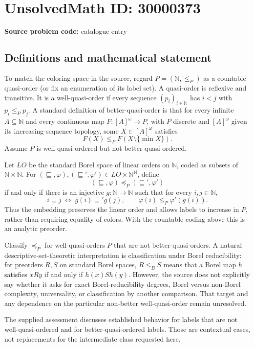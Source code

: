 \documentclass[11pt]{article}
\newcommand{\N}{\mathbb{N}}
\begin{document}
\section*{UnsolvedMath ID: 30000373}
\textbf{Source problem code:} catalogue entry
\subsection{Definitions and mathematical statement}
To match the coloring space in the source, regard $P=(\N,\le_P)$ as a countable quasi-order (or fix an enumeration of its label set). A quasi-order is reflexive and transitive. It is a well-quasi-order if every sequence $(p_i)_{i\in\N}$ has $i<j$ with $p_i\le_Pp_j$. A standard definition of better-quasi-order is that for every infinite $A\subseteq\N$ and every continuous map $F:[A]^\omega\to P$, with $P$ discrete and $[A]^\omega$ given its increasing-sequence topology, some $X\in[A]^\omega$ satisfies
\[
 F(X)\le_P F(X\setminus\{\min X\}).
\]
Assume $P$ is well-quasi-ordered but not better-quasi-ordered.

Let $LO$ be the standard Borel space of linear orders on $\N$, coded as subsets of $\N\times\N$. For $(\sqsubseteq,\varphi),(\sqsubseteq',\varphi')\in LO\times\N^{\N}$, define
\[
 (\sqsubseteq,\varphi)\preccurlyeq_P(\sqsubseteq',\varphi')
\]
if and only if there is an injective $g:\N\to\N$ such that for every $i,j\in\N$,
\[
 i\sqsubseteq j\ \Longleftrightarrow\ g(i)\sqsubseteq'g(j),
 \qquad \varphi(i)\le_P\varphi'(g(i)).
\]
Thus the embedding preserves the linear order and allows labels to increase in $P$, rather than requiring equality of colors. With the countable coding above this is an analytic preorder.

Classify $\preccurlyeq_P$ for well-quasi-orders $P$ that are not better-quasi-orders. A natural descriptive-set-theoretic interpretation is classification under Borel reducibility: for preorders $R,S$ on standard Borel spaces, $R\le_B S$ means that a Borel map $h$ satisfies $xRy$ if and only if $h(x)Sh(y)$. However, the source does not explicitly say whether it asks for exact Borel-reducibility degrees, Borel versus non-Borel complexity, universality, or classification by another comparison. That target and any dependence on the particular non-better well-quasi-order remain unresolved.

The supplied assessment discusses established behavior for labels that are not well-quasi-ordered and for better-quasi-ordered labels. Those are contextual cases, not replacements for the intermediate class requested here.
\end{document}
